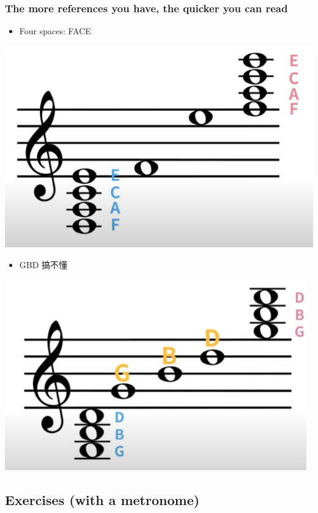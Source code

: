 \documentclass[11pt]{article}
\begin{document}
\subsubsection*{The more references you have, the quicker you can read}
\label{sec:orgdadd7d3}
\begin{itemize}
\item Four spaces: FACE
\end{itemize}
\begin{center}
\includegraphics[width=.9\linewidth]{./Handouts.org_20240214_220600.png}
\end{center}
\begin{itemize}
\item GBD 搞不懂
\end{itemize}
\begin{center}
\includegraphics[width=.9\linewidth]{./Handouts.org_20240214_220721.png}
\end{center}
\subsection*{Exercises (with a metronome)}
\label{sec:orge033599}
\end{document}
